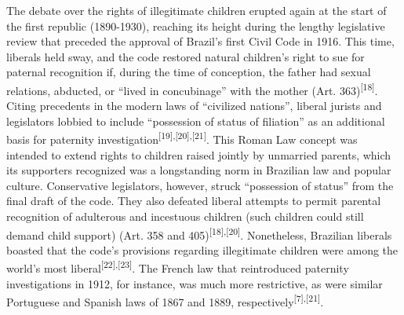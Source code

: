 \documentclass{article}
\begin{document}
The debate over the rights of illegitimate children erupted again at the start
of the first republic (1890-1930), reaching its height during the lengthy
legislative review that preceded the approval of Brazil’s first Civil Code in
1916. This time, liberals held sway, and the code restored natural children’s
right to sue for paternal recognition if, during the time of conception, the
father had sexual relations, abducted, or “lived in concubinage” with the mother
(Art. 363)\textsuperscript{[}\textsuperscript{18}\textsuperscript{]}. Citing precedents in the modern laws of “civilized nations”, liberal jurists
and legislators lobbied to include “possession of status of filiation” as an
additional basis for paternity investigation\textsuperscript{[}\textsuperscript{19}\textsuperscript{]}\textsuperscript{,}\textsuperscript{[}\textsuperscript{20}\textsuperscript{]}\textsuperscript{,}\textsuperscript{[}\textsuperscript{21}\textsuperscript{]}. This Roman Law concept was intended to extend rights to children raised
jointly by unmarried parents, which its supporters recognized was a longstanding
norm in Brazilian law and popular culture. Conservative legislators, however,
struck “possession of status” from the final draft of the code. They also
defeated liberal attempts to permit parental recognition of adulterous and
incestuous children (such children could still demand child support) (Art. 358
and 405)\textsuperscript{[}\textsuperscript{18}\textsuperscript{]}\textsuperscript{,}\textsuperscript{[}\textsuperscript{20}\textsuperscript{]}. Nonetheless, Brazilian liberals boasted that the code’s provisions regarding
illegitimate children were among the world’s most liberal\textsuperscript{[}\textsuperscript{22}\textsuperscript{]}\textsuperscript{,}\textsuperscript{[}\textsuperscript{23}\textsuperscript{]}. The French law that reintroduced paternity investigations in 1912, for
instance, was much more restrictive, as were similar Portuguese and Spanish laws
of 1867 and 1889, respectively\textsuperscript{[}\textsuperscript{7}\textsuperscript{]}\textsuperscript{,}\textsuperscript{[}\textsuperscript{21}\textsuperscript{]}.
\end{document}
